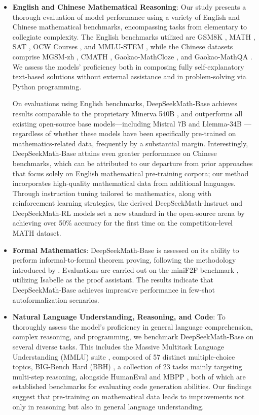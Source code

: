 \begin{itemize}[topsep=0pt]
    \item \textbf{English and Chinese Mathematical Reasoning}: Our study presents a thorough evaluation of model performance using a variety of English and Chinese mathematical benchmarks, encompassing tasks from elementary to collegiate complexity. The English benchmarks utilized are GSM8K \citep{gsm8k}, MATH \citep{MATH}, SAT \citep{llemma}, OCW Courses \citep{minerva}, and MMLU-STEM \citep{mmlu}, while the Chinese datasets comprise MGSM-zh \citep{mgsm}, CMATH \citep{wei2023cmath}, Gaokao-MathCloze \citep{agieval}, and Gaokao-MathQA \citep{agieval}. We assess the models’ proficiency both in composing fully self-explanatory text-based solutions without external assistance and in problem-solving via Python programming.

On evaluations using English benchmarks, DeepSeekMath-Base achieves results comparable to the proprietary Minerva 540B \citep{minerva}, and outperforms all existing open-source base models—including Mistral 7B \citep{mistral} and Llemma-34B \citep{llemma}—regardless of whether these models have been specifically pre-trained on mathematics-related data, frequently by a substantial margin. Interestingly, DeepSeekMath-Base attains even greater performance on Chinese benchmarks, which can be attributed to our departure from prior approaches \citep{minerva,llemma} that focus solely on English mathematical pre-training corpora; our method incorporates high-quality mathematical data from additional languages. Through instruction tuning tailored to mathematics, along with reinforcement learning strategies, the derived DeepSeekMath-Instruct and DeepSeekMath-RL models set a new standard in the open-source arena by achieving over 50\% accuracy for the first time on the competition-level MATH dataset.

\item \textbf{Formal Mathematics}: DeepSeekMath-Base is assessed on its ability to perform informal-to-formal theorem proving, following the methodology introduced by \citep{dsp_proof}. Evaluations are carried out on the miniF2F benchmark \citep{minif2f}, utilizing Isabelle \citep{isabelle} as the proof assistant. The results indicate that DeepSeekMath-Base achieves impressive performance in few-shot autoformalization scenarios.

\item \textbf{Natural Language Understanding, Reasoning, and Code}: To thoroughly assess the model’s proficiency in general language comprehension, complex reasoning, and programming, we benchmark DeepSeekMath-Base on several diverse tasks. This includes the Massive Multitask Language Understanding (MMLU) suite \citep{mmlu}, composed of 57 distinct multiple-choice topics, BIG-Bench Hard (BBH) \citep{bbh}, a collection of 23 tasks mainly targeting multi-step reasoning, alongside HumanEval \citep{codex} and MBPP \citep{mbpp}, both of which are established benchmarks for evaluating code generation abilities. Our findings suggest that pre-training on mathematical data leads to improvements not only in reasoning but also in general language understanding.


\end{itemize}
